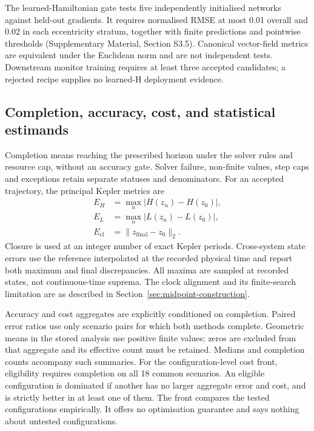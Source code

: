 \documentclass[final,3p,times]{elsarticle}
\begin{document}
The learned-Hamiltonian gate tests five independently initialised networks
against held-out gradients. It requires normalised RMSE at most 0.01
overall and 0.02 in each eccentricity stratum, together with finite
predictions and pointwise thresholds (Supplementary Material,
Section S3.5). Canonical vector-field metrics are equivalent under the
Euclidean norm and are not independent tests. Downstream monitor training
requires at least three accepted candidates; a rejected recipe supplies
no learned-H deployment evidence.

\subsection{Completion, accuracy, cost, and statistical estimands}
\label{sec:estimands}
Completion means reaching the prescribed horizon under the solver rules
and resource cap, without an accuracy gate. Solver failure, non-finite
values, step caps and exceptions retain separate statuses and denominators.
For an accepted trajectory, the principal Kepler metrics are
\begin{equation}
\begin{aligned}
 E_H&=\max_n|H(z_n)-H(z_0)|,\\
 E_L&=\max_n|L(z_n)-L(z_0)|,\\
 E_{\mathrm{cl}}&=\|z_{\mathrm{final}}-z_0\|_2.
\end{aligned}
\label{eq:kepler-error-metrics}
\end{equation}
Closure is used at an integer number of exact Kepler periods. Cross-system
state errors use the reference interpolated at the recorded physical time
and report both maximum and final discrepancies.
All maxima are sampled at recorded states, not continuous-time suprema.
The clock alignment and its finite-search limitation are as described in
Section~\ref{sec:midpoint-construction}.

Accuracy and cost aggregates are explicitly conditioned on completion.
Paired error ratios use only scenario pairs for which both methods
complete. Geometric means in the stored analysis use positive finite
values; zeros are excluded from that aggregate and its effective count
must be retained. Medians and completion counts accompany such summaries.
For the configuration-level cost front, eligibility requires completion
on all 18 common scenarios. An eligible configuration is dominated if
another has no larger aggregate error and cost, and is strictly better
in at least one of them. The front compares the tested configurations empirically.
It offers no optimisation guarantee and says nothing about untested
configurations.
\end{document}
